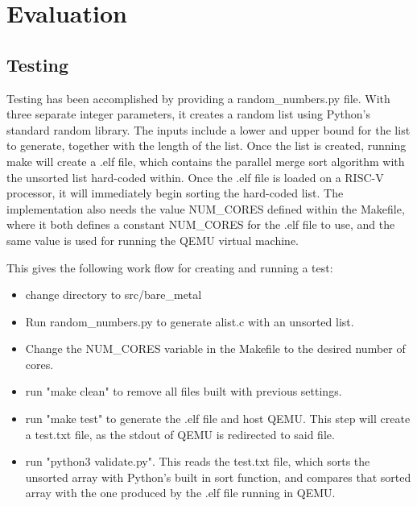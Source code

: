\section{Evaluation}
\subsection{Testing}\label{sec:testing}
Testing has been accomplished by providing a random\_numbers.py file. With three
separate integer parameters, it creates a random list using Python's standard
random library. The inputs include a lower and upper bound for the list to
generate, together with the length of the list. Once the list is created,
running make will create a .elf file, which contains the parallel merge sort
algorithm with the unsorted list hard-coded within. Once the .elf file is loaded
on a RISC-V processor, it will immediately begin sorting the hard-coded list. The
implementation also needs the value NUM\_CORES defined within the Makefile, where
it both defines a constant NUM\_CORES for the .elf file to use, and the same
value is used for running the QEMU virtual machine.

This gives the following work flow for creating and running a test:
\begin{itemize}
  \item change directory to src/bare\_metal
  \item Run random\_numbers.py to generate alist.c with an unsorted list.
  \item Change the NUM\_CORES variable in the Makefile to the desired number of
    cores.
  \item run "make clean" to remove all files built with previous settings.
  \item run "make test" to generate the .elf file and host QEMU. This step will
    create a test.txt file, as the stdout of QEMU is redirected to said file.
  \item run "python3 validate.py". This reads the test.txt file, which sorts the
    unsorted array with Python's built in sort function, and compares that sorted
    array with the one produced by the .elf file running in QEMU.
\end{itemize}

